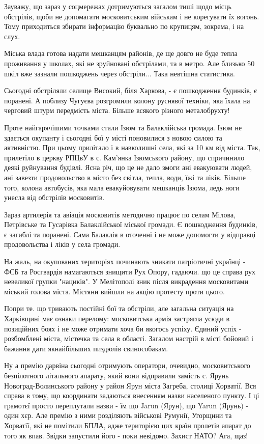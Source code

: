 Зауважу, що зараз у соцмережах дотримуються загалом тиші щодо місць обстрілів,
щоби не допомагати московитським військам і не корегувати їх вогонь. Тому
приходиться збирати інформацію буквально по крупицям, зокрема, і на слух.

Міська влада готова надати мешканцям районів, де ще довго не буде тепла
проживання у школах, які не зруйновані обстрілами, та в метро. Але близько 50
шкіл вже зазнали пошкоджень через обстріли... Така невтішна статистика.

Сьогодні обстріляли селище Високий, біля Харкова, - є пошкодження будинків, є
поранені. А поблизу Чугуєва розгромили колону руснявої техніки, яка їхала на
черговий штурм передмість міста. Більше всякого різного металобрухту!

Проте найгарячішими точками стали Ізюм та Балаклійська громада. Ізюм не
здається окупанту і сьогодні бої у місті поновилися з новою силою та
активністю. При цьому прилітало і в навколишні села, які за 10 км від міста.
Так, прилетіло в церкву РПЦвУ в с. Кам'янка Ізюмського району, що спричинило
деякі руйнування будівлі. Ясна річ, що це не дало змоги ані евакуювати людей,
ані завезти продовольство в місто без світла, тепла, води, їжі та ліків. Більше
того, колона автобусів, яка мала евакуйовувати мешканців Ізюма, ледь ноги
унесла від обстрілів московитів.

Зараз артилерія та авіація московитів методично працює по селам Мілова,
Петрівське та Гусарівка Балаклійської міської громади. Є пошкодження будинків,
є загиблі та поранені. Сама Балаклія в оточенні і не може допомогти у відправці
продовольства і ліків у села громади.

На жаль, на окупованих територіях починають зникати патріотичні українці - ФСБ
та Росгвардія намагаються знищити Рух Опору, гадаючи. що це справа рух
невеликої групки "нациків". У Мелітополі зник після викрадення московитами
міський голова міста. Містяни вийшли на акцію протесту проти цього.

Попри те. що тривають постійні бої та обстріли, але загальна ситуація на
Харківщині має ознаки перелому: московитська армія застрягла усюди в позиційних
боях і не може отримати хоча би якогось успіху. Єдиний успіх - розбомблені
міста, містечка та села в області. Загалом настрій в місті бойовий і бажання
дати якнайбільших пиздюлів свинособакам.

Ну а премію дарвіна сьогодні отримують оператори, очевидно, московитського
безпілотного літального апарату, який вони відправили замість с. Ярунь
Новоград-Волинського району у район Ярун міста Загреба, столиці Хорватії. Вся
справа в тому, що координати задаються внесенням назви населеного пункту. І ці
грамотєї просто переплутали назви - їм що Jarun (Ярун), що Yarun (Ярунь) - один
хєр. Але премію з ними розділяють військові Румунії, Угорщини та Хорватії, які
не помітили БПЛА, адже територією цих країн пролетів апарат до того як впав.
Звідки запустили його - поки невідомо. Захист НАТО? Ага, щаз!

